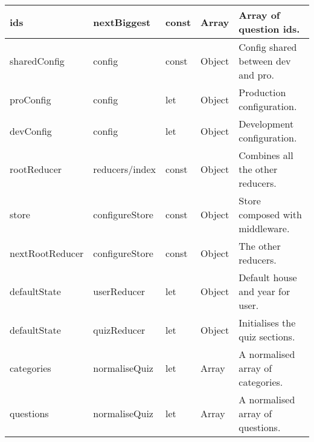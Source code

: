 \begin{table}[]
\begin{tabular}{|l|l|l|l|l|}
ids                                 & nextBiggest                          & const                              & Array                                & Array of question ids.                \\ \hline
sharedConfig                        & config                               & const                              & Object                               & Config shared between dev and pro.    \\ \hline
proConfig                           & config                               & let                                & Object                               & Production configuration.             \\ \hline
devConfig                           & config                               & let                                & Object                               & Development configuration.            \\ \hline
rootReducer                         & reducers/index                       & const                              & Object                               & Combines all the other reducers.      \\ \hline
store                               & configureStore                       & const                              & Object                               & Store composed with middleware.       \\ \hline
nextRootReducer                     & configureStore                       & const                              & Object                               & The other reducers.                   \\ \hline
defaultState                        & userReducer                          & let                                & Object                               & Default house and year for user.      \\ \hline
defaultState                        & quizReducer                          & let                                & Object                               & Initialises the quiz sections.        \\ \hline
categories                          & normaliseQuiz                        & let                                & Array                                & A normalised array of categories.     \\ \hline
questions                           & normaliseQuiz                        & let                                & Array                                & A normalised array of questions.      \\ \hline

\end{tabular}
\end{table}
